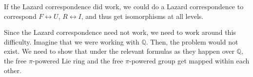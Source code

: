 \documentclass[10pt]{amsart}
\begin{document}
\begin{itemize}
  If the Lazard correspondence did work, we could do a Lazard
  correspondence to correspond $F \leftrightarrow U$, $R
  \leftrightarrow I$, and thus get isomorphisms at all levels.

  Since the Lazard correspondence need not work, we need to work
  around this difficulty. Imagine that we were working with
  $\mathbb{Q}$. Then, the problem would not exist. We need to show
  that under the relevant formulas as they happen over $\mathbb{Q}$,
  the free $\pi$-powered Lie ring and the free $\pi$-powered group get
  mapped within each other.

\end{itemize}
\end{document}
